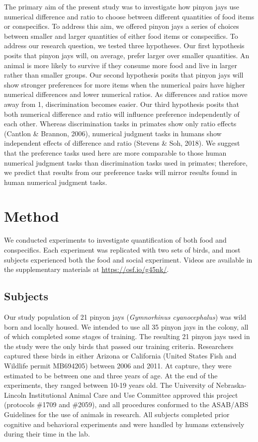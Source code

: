 \documentclass[
  ,pub,floatsintext]{apa6}
\begin{document}
The primary aim of the present study was to investigate how pinyon jays use numerical difference and ratio to choose between different quantities of food items or conspecifics. To address this aim, we offered pinyon jays a series of choices between smaller and larger quantities of either food items or conspecifics. To address our research question, we tested three hypotheses. Our first hypothesis posits that pinyon jays will, on average, prefer larger over smaller quantities. An animal is more likely to survive if they consume more food and live in larger rather than smaller groups. Our second hypothesis posits that pinyon jays will show stronger preferences for more items when the numerical pairs have higher numerical differences and lower numerical ratios. As differences and ratios move away from 1, discrimination becomes easier. Our third hypothesis posits that both numerical difference and ratio will influence preference independently of each other. Whereas discrimination tasks in primates show only ratio effects (Cantlon \& Brannon, 2006), numerical judgment tasks in humans show independent effects of difference and ratio (Stevens \& Soh, 2018). We suggest that the preference tasks used here are more comparable to those human numerical judgment tasks than discrimination tasks used in primates; therefore, we predict that results from our preference tasks will mirror results found in human numerical judgment tasks.

\hypertarget{method}{%
\section{Method}\label{method}}

We conducted experiments to investigate quantification of both food and conspecifics. Each experiment was replicated with two sets of birds, and most subjects experienced both the food and social experiment. Videos are available in the supplementary materials at \url{https://osf.io/g45nk/}.

\hypertarget{subjects}{%
\subsection{Subjects}\label{subjects}}

Our study population of 21 pinyon jays (\emph{Gymnorhinus cyanocephalus}) was wild born and locally housed. We intended to use all 35 pinyon jays in the colony, all of which completed some stages of training. The resulting 21 pinyon jays used in the study were the only birds that passed our training criteria. Researchers captured these birds in either Arizona or California (United States Fish and Wildlife permit MB694205) between 2006 and 2011. At capture, they were estimated to be between one and three years of age. At the end of the experiments, they ranged between 10-19 years old. The University of Nebraska-Lincoln Institutional Animal Care and Use Committee approved this project (protocols \#1709 and \#2059), and all procedures conformed to the ASAB/ABS Guidelines for the use of animals in research. All subjects completed prior cognitive and behavioral experiments and were handled by humans extensively during their time in the lab.
\end{document}
